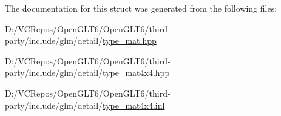 The documentation for this struct was generated from the following files\+:\begin{DoxyCompactItemize}
\item 
D\+:/\+V\+C\+Repos/\+Open\+G\+L\+T6/\+Open\+G\+L\+T6/third-\/party/include/glm/detail/\mbox{\hyperlink{type__mat_8hpp}{type\+\_\+mat.\+hpp}}\item 
D\+:/\+V\+C\+Repos/\+Open\+G\+L\+T6/\+Open\+G\+L\+T6/third-\/party/include/glm/detail/\mbox{\hyperlink{type__mat4x4_8hpp}{type\+\_\+mat4x4.\+hpp}}\item 
D\+:/\+V\+C\+Repos/\+Open\+G\+L\+T6/\+Open\+G\+L\+T6/third-\/party/include/glm/detail/\mbox{\hyperlink{type__mat4x4_8inl}{type\+\_\+mat4x4.\+inl}}\end{DoxyCompactItemize}
